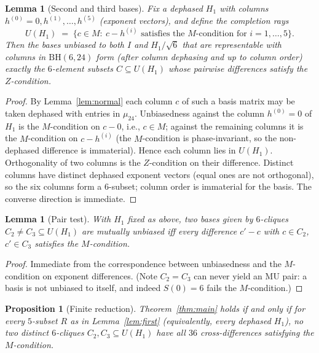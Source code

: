\documentclass[11pt]{article}
\newtheorem{lemma}[theorem]{Lemma}
\newtheorem{proposition}[theorem]{Proposition}
\theoremstyle{remark}
\begin{document}
\begin{lemma}[Second and third bases]\label{lem:completion}
Fix a dephased $H_1$ with columns $h^{(0)} = 0, h^{(1)}, \dots,
h^{(5)}$ (exponent vectors), and define the \emph{completion rays}
\[
  U(H_1) \;=\; \bigl\{c \in M :\ c - h^{(i)} \text{ satisfies the
  $M$-condition for } i = 1, \dots, 5 \bigr\}.
\]
Then the bases unbiased to both $I$ and $H_1/\sqrt6$ that are
representable with columns in $\mathrm{BH}(6,24)$ form (after column
dephasing and up to column order) exactly the $6$-element subsets $C
\subseteq U(H_1)$ whose pairwise differences satisfy the
$Z$-condition.
\end{lemma}

\begin{proof}
By Lemma~\ref{lem:normal} each column $c$ of such a basis matrix may be
taken dephased with entries in $\mu_{24}$. Unbiasedness against the
column $h^{(0)} = 0$ of $H_1$ is the $M$-condition on $c - 0$, i.e., $c
\in M$; against the remaining columns it is the $M$-condition on $c -
h^{(i)}$ (the $M$-condition is phase-invariant, so the non-dephased
difference is immaterial). Hence each column lies in $U(H_1)$.
Orthogonality of two columns is the $Z$-condition on their difference.
Distinct columns have distinct dephased exponent vectors (equal ones
are not orthogonal), so the six columns form a $6$-subset; column order
is immaterial for the basis. The converse direction is immediate.
\end{proof}

\begin{lemma}[Pair test]\label{lem:pair}
With $H_1$ fixed as above, two bases given by $6$-cliques $C_2 \ne C_3
\subseteq U(H_1)$ are mutually unbiased iff every difference $c' - c$
with $c \in C_2$, $c' \in C_3$ satisfies the $M$-condition.
\end{lemma}

\begin{proof}
Immediate from the correspondence between unbiasedness and the
$M$-condition on exponent differences. (Note $C_2 = C_3$ can never
yield an MU pair: a basis is not unbiased to itself, and indeed $S(0) =
6$ fails the $M$-condition.)
\end{proof}

\begin{proposition}[Finite reduction]\label{prop:reduction}
Theorem~\ref{thm:main} holds if and only if for every $5$-subset $R$ as
in Lemma~\ref{lem:first} (equivalently, every dephased $H_1$), no two
distinct $6$-cliques $C_2, C_3 \subseteq U(H_1)$ have all $36$
cross-differences satisfying the $M$-condition.
\end{proposition}
\end{document}
